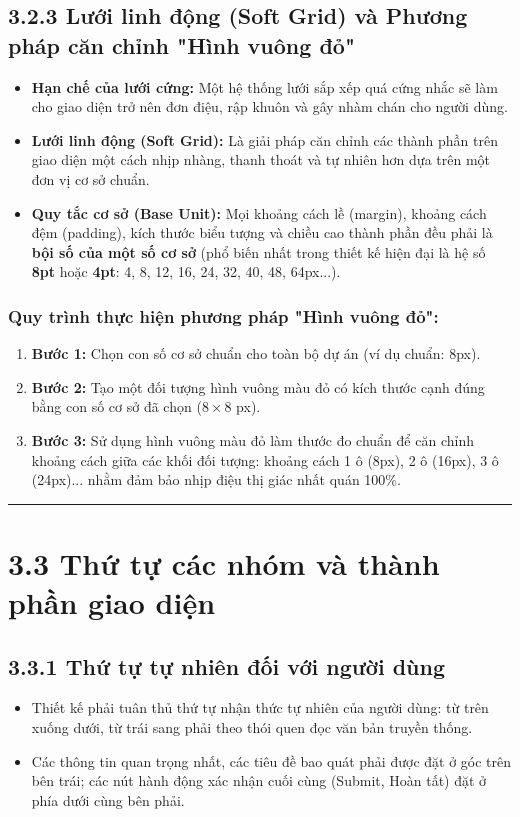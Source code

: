 \documentclass[11pt,a4paper,oneside]{report}
\begin{document}
\subsection{3.2.3 Lưới linh động (Soft Grid) và Phương pháp căn chỉnh "Hình vuông đỏ"}
\begin{itemize}[leftmargin=1.5em]
\item \textbf{Hạn chế của lưới cứng:} Một hệ thống lưới sắp xếp quá cứng nhắc sẽ làm cho giao diện trở nên đơn điệu, rập khuôn và gây nhàm chán cho người dùng.
\item \textbf{Lưới linh động (Soft Grid):} Là giải pháp căn chỉnh các thành phần trên giao diện một cách nhịp nhàng, thanh thoát và tự nhiên hơn dựa trên một đơn vị cơ sở chuẩn.
\item \textbf{Quy tắc cơ sở (Base Unit):} Mọi khoảng cách lề (margin), khoảng cách đệm (padding), kích thước biểu tượng và chiều cao thành phần đều phải là \textbf{bội số của một số cơ sở} (phổ biến nhất trong thiết kế hiện đại là hệ số \textbf{8pt} hoặc \textbf{4pt}: 4, 8, 12, 16, 24, 32, 40, 48, 64px...).
\end{itemize}

\subsubsection{Quy trình thực hiện phương pháp "Hình vuông đỏ":}
\begin{enumerate}[leftmargin=1.5em]
\item \textbf{Bước 1:} Chọn con số cơ sở chuẩn cho toàn bộ dự án (ví dụ chuẩn: 8px).
\item \textbf{Bước 2:} Tạo một đối tượng hình vuông màu đỏ có kích thước cạnh đúng bằng con số cơ sở đã chọn ($8 \times 8$ px).
\item \textbf{Bước 3:} Sử dụng hình vuông màu đỏ làm thước đo chuẩn để căn chỉnh khoảng cách giữa các khối đối tượng: khoảng cách 1 ô (8px), 2 ô (16px), 3 ô (24px)... nhằm đảm bảo nhịp điệu thị giác nhất quán 100\%.
\end{enumerate}

\bigskip\hrule\bigskip

\section{3.3 Thứ tự các nhóm và thành phần giao diện}

\subsection{3.3.1 Thứ tự tự nhiên đối với người dùng}
\begin{itemize}[leftmargin=1.5em]
\item Thiết kế phải tuân thủ thứ tự nhận thức tự nhiên của người dùng: từ trên xuống dưới, từ trái sang phải theo thói quen đọc văn bản truyền thống.
\item Các thông tin quan trọng nhất, các tiêu đề bao quát phải được đặt ở góc trên bên trái; các nút hành động xác nhận cuối cùng (Submit, Hoàn tất) đặt ở phía dưới cùng bên phải.
\end{itemize}
\end{document}

